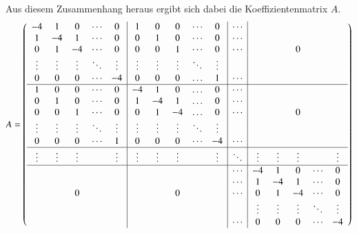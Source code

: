 \begin{refsection}
Aus diesem Zusammenhang heraus ergibt sich dabei die Koeffizientenmatrix
$A$.
\[
	A=\left(
	\begin{array}{ccccc|ccccc|c|ccccc}
	    -4&     1&     0&\cdots&     0 &     1&     0&     0&\cdots&     0 &\cdots &      &      &      &      &      \\
	     1&    -4&     1&\cdots&     0 &     0&     1&     0&\cdots&     0 &\cdots &      &      &      &      &      \\
	     0&     1&    -4&\cdots&     0 &     0&     0&     1&\cdots&     0 &\cdots &      &      &     0&      &      \\
	\vdots&\vdots&\vdots&\ddots&\vdots &\vdots&\vdots&\vdots&\ddots&\vdots &       &      &      &      &      &      \\
	     0&     0&     0&\cdots&    -4 &     0&     0&     0&\dots &     1 &\cdots &      &      &      &      &      \\
	\hline
	     1&     0&     0&\cdots&     0 &    -4&     1&     0&\dots &     0 &\cdots &      &      &      &      &      \\
	     0&     1&     0&\cdots&     0 &     1&    -4&     1&\dots &     0 &\cdots &      &      &      &      &      \\
	     0&     0&     1&\cdots&     0 &     0&     1&    -4&\dots &     0 &\cdots &      &      &     0&      &      \\
	\vdots&\vdots&\vdots&\ddots&\vdots &\vdots&\vdots&\vdots&\ddots&\vdots &       &      &      &      &      &      \\
	     0&     0&     0&\cdots&     1 &     0&     0&     0&\cdots&    -4 &\cdots &      &      &      &      &      \\
	\hline
	\vdots&\vdots&\vdots&      &\vdots &\vdots&\vdots&\vdots&      &\vdots &\ddots &\vdots&\vdots&\vdots&      &\vdots\\
	\hline
	      &      &      &      &       &      &      &      &      &       &\cdots &    -4&     1&     0&\cdots&     0\\
	      &      &      &      &       &      &      &      &      &       &\cdots &     1&    -4&     1&\cdots&     0\\
	      &      &     0&      &       &      &      &     0&      &       &\cdots &     0&     1&    -4&\cdots&     0\\
	      &      &      &      &       &      &      &      &      &       &       &\vdots&\vdots&\vdots&\ddots&\vdots\\
	      &      &      &      &       &      &      &      &      &       &\cdots &     0&     0&     0&\cdots&    -4\\
	\end{array}
	\right) 
	\]


\end{refsection}
